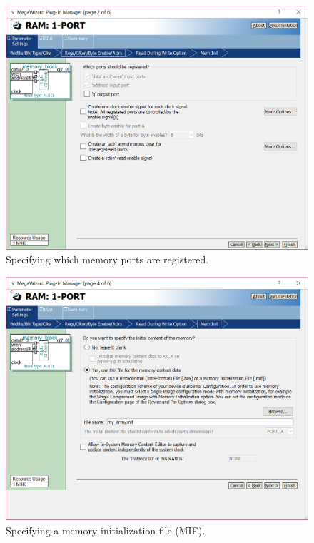 \documentclass[epsfig,10pt,fullpage]{article}
\begin{document}
\begin{figure}[H]
	\begin{center}
		\includegraphics[scale=0.4]{figures/figure6.png}
	\end{center}
	\caption{Specifying which memory ports are registered.}
	\label{fig:fig6}
\end{figure}

\begin{figure}[H]
	\begin{center}
		\includegraphics[scale=0.4]{figures/figure7.png}
	\end{center}
	\caption{Specifying a memory initialization file (MIF).}
	\label{fig:fig7}
\end{figure}
\end{document}
